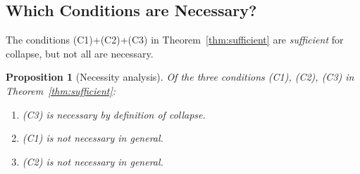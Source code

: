 \documentclass[11pt,a4paper]{article}
\theoremstyle{plain}
\newtheorem{proposition}[theorem]{Proposition}
\theoremstyle{definition}
\begin{document}
\subsection{Which Conditions are Necessary?}

The conditions (C1)+(C2)+(C3) in Theorem~\ref{thm:sufficient} are
\emph{sufficient} for collapse, but not all are necessary.

\begin{thmbox}
\begin{proposition}[Necessity analysis]
\label{prop:necessity}
Of the three conditions (C1), (C2), (C3) in Theorem~\ref{thm:sufficient}:
\begin{enumerate}[label=(\roman*)]
\item \textup{(C3)} is necessary by definition of collapse.
\item \textup{(C1)} is \emph{not} necessary in general.
\item \textup{(C2)} is \emph{not} necessary in general.
\end{enumerate}
\end{proposition}
\end{thmbox}
\end{document}
